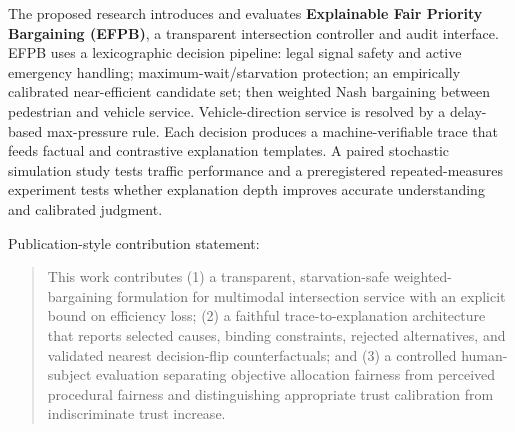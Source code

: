 \documentclass[
  english,
  11pt,
  a4paper,
]{article}
\begin{document}
The proposed research introduces and evaluates \textbf{Explainable Fair
Priority Bargaining (EFPB)}, a transparent intersection controller and
audit interface. EFPB uses a lexicographic decision pipeline: legal
signal safety and active emergency handling; maximum-wait/starvation
protection; an empirically calibrated near-efficient candidate set; then
weighted Nash bargaining between pedestrian and vehicle service.
Vehicle-direction service is resolved by a delay-based max-pressure
rule. Each decision produces a machine-verifiable trace that feeds
factual and contrastive explanation templates. A paired stochastic
simulation study tests traffic performance and a preregistered
repeated-measures experiment tests whether explanation depth improves
accurate understanding and calibrated judgment.

Publication-style contribution statement:

\begin{quote}
This work contributes (1) a transparent, starvation-safe
weighted-bargaining formulation for multimodal intersection service with
an explicit bound on efficiency loss; (2) a faithful
trace-to-explanation architecture that reports selected causes, binding
constraints, rejected alternatives, and validated nearest decision-flip
counterfactuals; and (3) a controlled human-subject evaluation
separating objective allocation fairness from perceived procedural
fairness and distinguishing appropriate trust calibration from
indiscriminate trust increase.
\end{quote}
\end{document}
